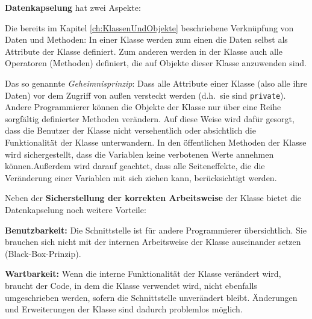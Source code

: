 \textbf{Datenkapselung} hat zwei Aspekte:

\begin{compactenum}
\item Die bereits im Kapitel \ref{ch:KlassenUndObjekte} beschriebene
Verknüpfung von Daten und Methoden: In einer Klasse werden zum einen die Daten
selbst als Attribute der Klasse definiert. Zum anderen werden in der Klasse auch
alle Operatoren (Methoden) definiert, die auf Objekte dieser Klasse anzuwenden
sind.
\item Das so genannte \emph{Geheimnisprinzip}: Dass alle Attribute einer Klasse
(also alle ihre Daten) vor dem Zugriff von außen versteckt werden (d.h.\ sie
sind \lstinline|private|). Andere Programmierer können die Objekte der Klasse
nur über eine Reihe sorgfältig definierter Methoden verändern. Auf diese Weise
wird dafür gesorgt, dass die Benutzer der Klasse nicht versehentlich oder
absichtlich die Funktionalität der Klasse unterwandern. In den öffentlichen
Methoden der Klasse wird sichergestellt, dass die Variablen keine verbotenen
Werte annehmen können.Außerdem wird darauf geachtet, dass alle Seiteneffekte,
die die Veränderung einer Variablen mit sich ziehen kann, berücksichtigt werden.
\end{compactenum}

Neben der \textbf{Sicherstellung der korrekten Arbeitsweise} der Klasse bietet
die Datenkapselung noch weitere Vorteile:

\begin{compactitem}
\item[\textbf{Benutzbarkeit:}] Die Schnittstelle ist für andere Programmierer
übersichtlich. Sie brauchen sich nicht mit der internen Arbeitsweise der Klasse
auseinander setzen (Black-Box-Prinzip).
\item[\textbf{Wartbarkeit:}] Wenn die interne Funktionalität der Klasse
verändert wird, braucht der Code, in dem die Klasse verwendet wird, nicht
ebenfalls umgeschrieben werden, sofern die Schnittstelle unverändert bleibt.
Änderungen und Erweiterungen der Klasse sind dadurch problemlos möglich.
\end{compactitem}
